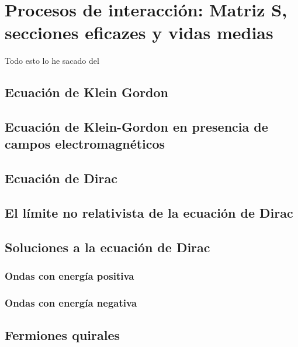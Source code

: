 \setchapterpreamble[u]{\margintoc}
\chapter{Procesos de interacción: Matriz S, secciones eficazes y vidas medias}

\begin{center}
  \large Todo esto lo he sacado del \cite{Dobdado}
\end{center}
\section{Ecuación de Klein Gordon}
\section{Ecuación de Klein-Gordon en presencia de campos electromagnéticos}
\section{Ecuación de Dirac}
\section{El límite no relativista de la ecuación de Dirac}
\section{Soluciones a la ecuación de Dirac}
\subsection{Ondas con energía positiva}
\subsection{Ondas con energía negativa}
\section{Fermiones quirales}